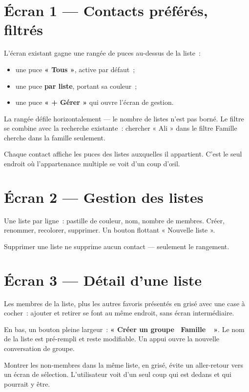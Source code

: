 \section{Écran 1 --- Contacts préférés, filtrés}

L'écran existant gagne une rangée de puces au-dessus de la liste~:

\begin{itemize}[leftmargin=1.4em]
  \item une puce \textbf{« Tous »}, active par défaut~;
  \item une puce \textbf{par liste}, portant sa couleur~;
  \item une puce \textbf{« + Gérer »} qui ouvre l'écran de gestion.
\end{itemize}

La rangée défile horizontalement --- le nombre de listes n'est pas borné. Le filtre se
combine avec la recherche existante~: chercher « Ali » dans le filtre Famille cherche dans
la famille seulement.

Chaque contact affiche les puces des listes auxquelles il appartient. C'est le seul endroit
où l'appartenance multiple se voit d'un coup d'{\oe}il.

\section{Écran 2 --- Gestion des listes}

Une liste par ligne~: pastille de couleur, nom, nombre de membres. Créer, renommer,
recolorer, supprimer. Un bouton flottant « Nouvelle liste ».

Supprimer une liste ne supprime aucun contact --- seulement le rangement.

\section{Écran 3 --- Détail d'une liste}

Les membres de la liste, plus les autres favoris présentés en grisé avec une case à cocher~:
ajouter et retirer se font au même endroit, sans écran intermédiaire.

En bas, un bouton pleine largeur~: \textbf{« Créer un groupe \guillemotleft~Famille~\guillemotright~»}.
Le nom de la liste est pré-rempli et reste modifiable. Un appui ouvre la nouvelle
conversation de groupe.

\begin{note}
Montrer les non-membres dans la même liste, en grisé, évite un aller-retour vers un écran
de sélection. L'utilisateur voit d'un seul coup qui est dedans et qui pourrait y être.
\end{note}

